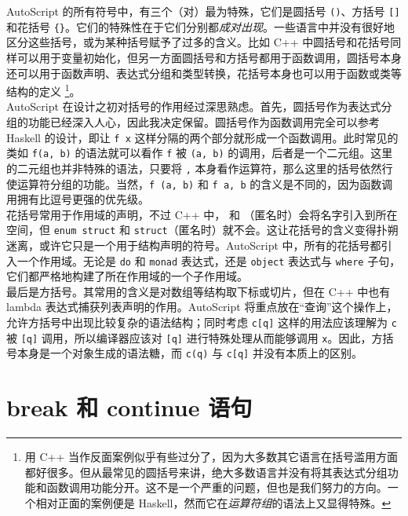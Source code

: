 AutoScript 的所有符号中，有三个（对）最为特殊，它们是圆括号 \lstinline!()!、方括号 \lstinline![]! 和花括号 \lstinline!{}!。它们的特殊性在于它们分别都\emph{成对出现}。一些语言中并没有很好地区分这些括号，或为某种括号赋予了过多的含义。比如 C++ 中圆括号和花括号同样可以用于变量初始化，但另一方面圆括号和方括号都用于函数调用，圆括号本身还可以用于函数声明、表达式分组和类型转换，花括号本身也可以用于函数或类等结构的定义 \footnote{用 C++ 当作反面案例似乎有些过分了，因为大多数其它语言在括号滥用方面都好很多。但从最常见的圆括号来讲，绝大多数语言并没有将其表达式分组功能和函数调用功能分开。这不是一个严重的问题，但也是我们努力的方向。一个相对正面的案例便是 Haskell，然而它在\emph{运算符组}的语法上又显得特殊。}。 \\

AutoScript 在设计之初对括号的作用经过深思熟虑。首先，圆括号作为表达式分组的功能已经深入人心，因此我决定保留。圆括号作为函数调用完全可以参考 Haskell 的设计，即让 \lstinline!f x! 这样分隔的两个部分就形成一个函数调用。此时常见的类如 \lstinline!f(a, b)! 的语法就可以看作 \lstinline!f! 被 \lstinline!(a, b)! 的调用，后者是一个二元组。这里的二元组也并非特殊的语法，只要将 \lstinline!,! 本身看作运算符，那么这里的括号依然行使运算符分组的功能。当然，\lstinline!f (a, b)! 和 \lstinline!f a, b! 的含义是不同的，因为函数调用拥有比逗号更强的优先级。 \\

花括号常用于作用域的声明，不过 C++ 中， 和 （匿名时）会将名字引入到所在空间，但 \lstinline!enum struct! 和 \lstinline!struct!（匿名时）就不会。这让花括号的含义变得扑朔迷离，或许它只是一个用于结构声明的符号。AutoScript 中，所有的花括号都引入一个作用域。无论是 \lstinline!do! 和 \lstinline!monad! 表达式，还是 \lstinline!object! 表达式与 \lstinline!where! 子句，它们都严格地构建了所在作用域的一个子作用域。 \\

最后是方括号。其常用的含义是对数组等结构取下标或切片，但在 C++ 中也有 lambda 表达式捕获列表声明的作用。AutoScript 将重点放在“查询”这个操作上，允许方括号中出现比较复杂的语法结构；同时考虑 \lstinline!c[q]! 这样的用法应该理解为 \lstinline!c! 被 \lstinline![q]! 调用，所以编译器应该对 \lstinline![q]! 进行特殊处理从而能够调用 \lstinline!x!。因此，方括号本身是一个对象生成的语法糖，而 \lstinline!c(q)! 与 \lstinline!c[q]! 并没有本质上的区别。


\section{break 和 continue 语句}

